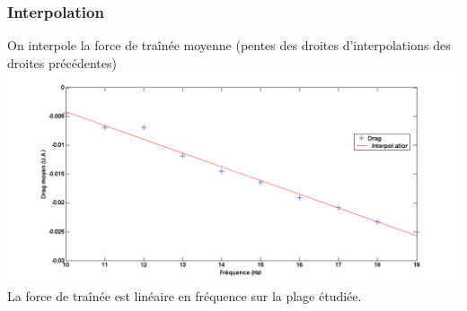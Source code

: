 \documentclass{beamer}
\begin{document}
 \begin{frame}
   \frametitle{Interpolation}
   On interpole la force de traînée moyenne (pentes des droites
   d'interpolations des droites précédentes) 
   \centering \includegraphics[width= 0.8 \linewidth]{modulationfreq.png} \\
   La force de traînée est linéaire en fréquence sur la plage étudiée.
 \end{frame}
\end{document}
